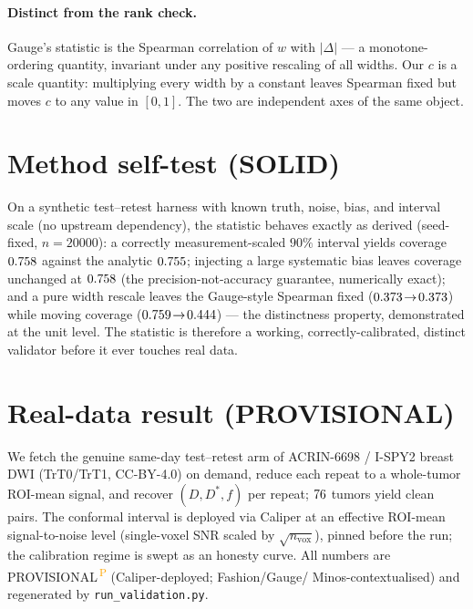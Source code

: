 \documentclass[11pt]{article}
\newcommand{\PROV}{\textsuperscript{\textcolor{orange}{\,P}}}
\newcommand{\Dstar}{D^{*}}
\begin{document}
\paragraph{Distinct from the rank check.} Gauge's statistic is the Spearman correlation of
$w$ with $|\Delta|$ --- a monotone-ordering quantity, invariant under any positive rescaling
of all widths. Our $c$ is a scale quantity: multiplying every width by a constant leaves
Spearman fixed but moves $c$ to any value in $[0,1]$. The two are independent axes of the
same object.

\section{Method self-test (SOLID)}\label{sec:selftest}
On a synthetic test--retest harness with known truth, noise, bias, and interval scale (no
upstream dependency), the statistic behaves exactly as derived (seed-fixed, $n{=}20000$):
a correctly measurement-scaled $90\%$ interval yields coverage $0.758$ against the
analytic $0.755$; injecting a large systematic bias leaves coverage unchanged at
$0.758$ (the precision-not-accuracy guarantee, numerically exact); and a pure width
rescale leaves the Gauge-style Spearman fixed ($0.373\!\to\!0.373$) while
moving coverage ($0.759\!\to\!0.444$) --- the distinctness property,
demonstrated at the unit level. The statistic is therefore a working, correctly-calibrated,
distinct validator before it ever touches real data.

\section{Real-data result (PROVISIONAL)}\label{sec:real}
We fetch the genuine same-day test--retest arm of ACRIN-6698 / I-SPY2 breast DWI
(TrT0/TrT1, CC-BY-4.0) on demand, reduce each repeat to a whole-tumor ROI-mean signal, and
recover $(D,\Dstar,f)$ per repeat; $76$ tumors yield clean pairs. The conformal interval
is deployed via Caliper at an effective ROI-mean signal-to-noise level (single-voxel SNR
scaled by $\sqrt{n_{\mathrm{vox}}}$), pinned before the run; the calibration regime is swept
as an honesty curve. All numbers are PROVISIONAL\PROV{} (Caliper-deployed; Fashion/Gauge/
Minos-contextualised) and regenerated by \texttt{run\_validation.py}.
\end{document}
